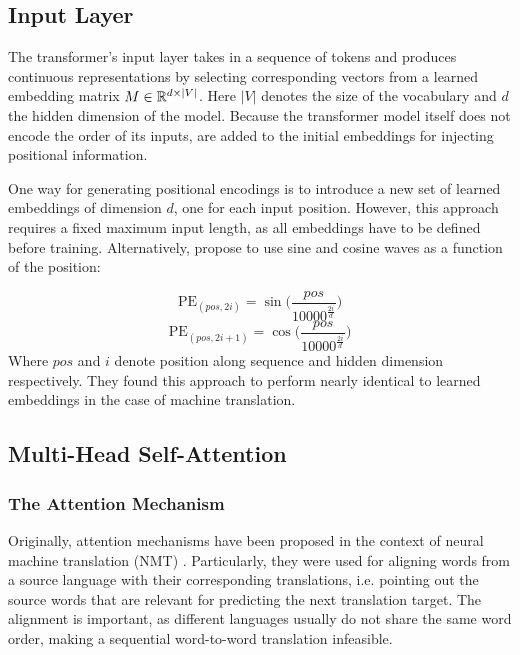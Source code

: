 \subsection{Input Layer}
The transformer's input layer takes in a sequence of tokens and produces continuous representations by selecting corresponding vectors from a learned embedding matrix $M \in \mathbb{R}^{d \times |V|}$. Here $|V|$ denotes the size of the vocabulary and $d$ the hidden dimension of the model. Because the transformer model itself does not encode the order of its inputs,  are added to the initial embeddings for injecting positional information.

One way for generating positional encodings is to introduce a new set of learned embeddings of dimension $d$, one for each input position. However, this approach requires a fixed maximum input length, as all embeddings have to be defined before training. Alternatively, \cite{vaswani2017attention} propose to use sine and cosine waves as a function of the position:

\begin{equation}
    \text{PE}_{(pos, 2i)} = \sin\bigg(\frac{pos}{10000^{\frac{2i}{d}}}\bigg)
\end{equation}
\begin{equation}
    \text{PE}_{(pos, 2i + 1)} = \cos\bigg(\frac{pos}{10000^{\frac{2i}{d}}}\bigg)
\end{equation}
Where $pos$ and $i$ denote position along sequence and hidden dimension respectively. They found this approach to perform nearly identical to learned embeddings in the case of machine translation.

\subsection{Multi-Head Self-Attention}
\subsubsection{The Attention Mechanism}
Originally, attention mechanisms have been proposed in the context of neural machine translation (NMT) \cite{bahdanau2014neural,luong2015effective}. Particularly, they were used for aligning words from a source language with their corresponding translations, i.e. pointing out the source words that are relevant for predicting the next translation target. The alignment is important, as different languages usually do not share the same word order, making a sequential word-to-word translation infeasible.

